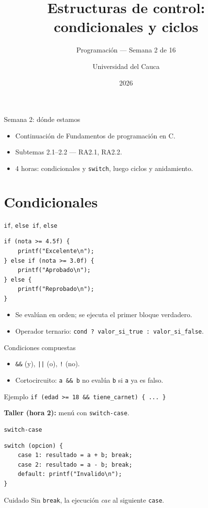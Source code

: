 \documentclass[11pt]{beamer}
\title[Semana 2: Estructuras de control]{Estructuras de control: condicionales y ciclos}
\subtitle{Programación --- Semana 2 de 16}
\author{Universidad del Cauca}
\date{2026}
\begin{document}
\begin{frame}
  \titlepage
\end{frame}

\begin{frame}{Semana 2: dónde estamos}
  \begin{itemize}
    \item Continuación de Fundamentos de programación en C.
    \item Subtemas 2.1--2.2 --- RA2.1, RA2.2.
    \item 4 horas: condicionales y \texttt{switch}, luego ciclos y anidamiento.
  \end{itemize}
  \tableofcontents
\end{frame}

\section{Condicionales}

\begin{frame}[fragile]{\texttt{if}, \texttt{else if}, \texttt{else}}
\begin{lstlisting}
if (nota >= 4.5f) {
    printf("Excelente\n");
} else if (nota >= 3.0f) {
    printf("Aprobado\n");
} else {
    printf("Reprobado\n");
}
\end{lstlisting}
  \begin{itemize}
    \item Se evalúan en orden; se ejecuta el primer bloque verdadero.
    \item Operador ternario: \texttt{cond ? valor\_si\_true : valor\_si\_false}.
  \end{itemize}
\end{frame}

\begin{frame}{Condiciones compuestas}
  \begin{itemize}
    \item \texttt{\&\&} (y), \texttt{||} (o), \texttt{!} (no).
    \item Cortocircuito: \texttt{a \&\& b} no evalúa \texttt{b} si \texttt{a} ya es falso.
  \end{itemize}
  \begin{block}{Ejemplo}
    \texttt{if (edad >= 18 \&\& tiene\_carnet) \{ ... \}}
  \end{block}
  \vfill
  \textbf{Taller (hora 2):} menú con \texttt{switch-case}.
\end{frame}

\begin{frame}[fragile]{\texttt{switch-case}}
\begin{lstlisting}
switch (opcion) {
    case 1: resultado = a + b; break;
    case 2: resultado = a - b; break;
    default: printf("Invalido\n");
}
\end{lstlisting}
  \begin{alertblock}{Cuidado}
    Sin \texttt{break}, la ejecución \emph{cae} al siguiente \texttt{case}.
  \end{alertblock}
\end{frame}
\end{document}
